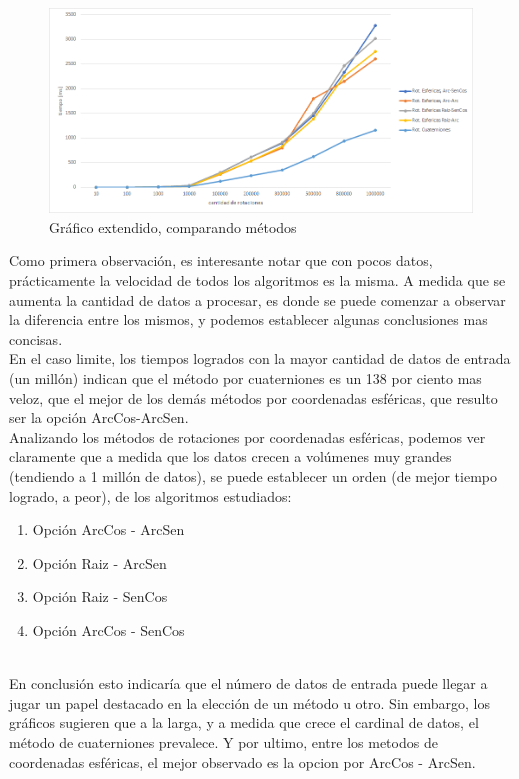 \documentclass[spanish]{article}
\begin{document}
\begin{figure}[H]
  \centering
    \includegraphics[scale=0.65, left]{resultgrafico.png}
  \caption{Gráfico extendido, comparando métodos}
  \label{fig:ejemplo}
\end{figure}

  
  Como primera observación, es interesante notar que con pocos datos, prácticamente la velocidad de todos los algoritmos es la misma. 
  A medida que se aumenta la cantidad de datos a procesar, es donde se puede comenzar a observar la diferencia entre los mismos, y podemos establecer algunas conclusiones mas concisas. \\
  
    
  En el caso limite, los tiempos logrados con la mayor cantidad de datos de entrada (un millón) indican que el método por cuaterniones es un 138 por ciento mas veloz, que el mejor de los demás métodos por coordenadas esféricas, que resulto ser la opción ArcCos-ArcSen.\\
  
  Analizando los métodos de rotaciones por coordenadas esféricas, podemos ver claramente que a medida que los datos crecen a volúmenes muy grandes (tendiendo a 1 millón de datos), se puede establecer un orden (de mejor tiempo logrado, a peor), de los algoritmos estudiados:
  
    \begin{enumerate}
        \item Opción ArcCos - ArcSen
        \item Opción Raiz - ArcSen
        \item Opción Raiz - SenCos
        \item Opción ArcCos - SenCos
    \end{enumerate}\\

  En conclusión esto indicaría que el número de datos de entrada puede llegar a jugar un papel destacado en la elección de un método u otro. 
  Sin embargo, los gráficos sugieren que a la larga, y a medida que crece el cardinal de datos, el método de cuaterniones prevalece. 
  Y por ultimo, entre los metodos de coordenadas esféricas, el mejor observado es la opcion por ArcCos - ArcSen.\\
  
\end{document}
